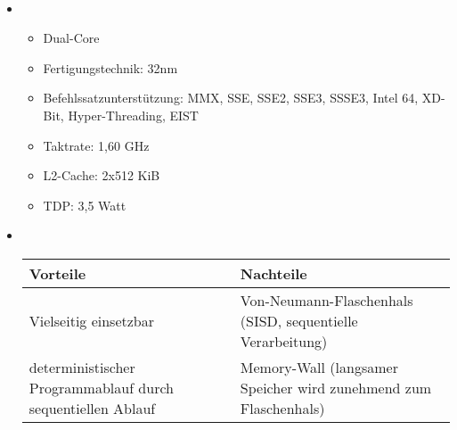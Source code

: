 \documentclass[a4paper]{scrartcl}
\begin{document}
\setcounter{aufgabe}{3}

\begin{aufgabe}~

	\begin{itemize}
		\item
			\begin{itemize}
				\item
					Dual-Core
				\item
					Fertigungstechnik: 32nm
				\item
					Befehlssatzunterstützung: MMX, SSE, SSE2, SSE3, SSSE3, Intel 64, XD-Bit, Hyper-Threading, EIST
				\item
					Taktrate: 1,60 GHz
				\item
					L2-Cache: 2x512 KiB
				\item
					TDP: 3,5 Watt
			\end{itemize}
		\item ~
			\begin{table}[h]
				\centering
				\begin{tabular}{p{8cm}|p{8cm}}
					Vorteile & Nachteile \\ \hline
					Vielseitig einsetzbar & Von-Neumann-Flaschenhals (SISD, sequentielle Verarbeitung) \\
					deterministischer Programmablauf durch sequentiellen Ablauf & Memory-Wall (langsamer Speicher wird zunehmend zum Flaschenhals)


\end{tabular}
\end{table}
\end{itemize}
\end{aufgabe}
\end{document}
